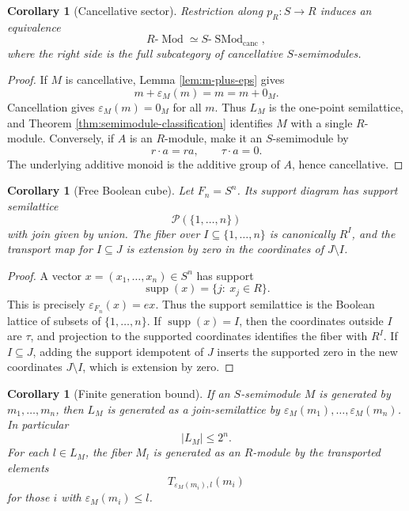 \documentclass[11pt]{article}
\newcommand{\supp}{\operatorname{supp}}
\newcommand{\eps}{\varepsilon}
\theoremstyle{plain}
\newtheorem{corollary}[theorem]{Corollary}
\theoremstyle{definition}
\begin{document}
\begin{corollary}[Cancellative sector]\label{cor:cancellative}
Restriction along \(p_R:S\to R\) induces an equivalence
\[
   R\text{-}\operatorname{Mod}\simeq S\text{-}\operatorname{SMod}_{\operatorname{canc}},
\]
where the right side is the full subcategory of cancellative \(S\)-semimodules.
\end{corollary}

\begin{proof}
If \(M\) is cancellative, Lemma \ref{lem:m-plus-eps} gives
\[
   m+\eps_M(m)=m=m+0_M.
\]
Cancellation gives \(\eps_M(m)=0_M\) for all \(m\).  Thus \(L_M\) is the one-point semilattice, and Theorem \ref{thm:semimodule-classification} identifies \(M\) with a single \(R\)-module.  Conversely, if \(A\) is an \(R\)-module, make it an \(S\)-semimodule by
\[
   r\cdot a=ra,
   \qquad
   \tau\cdot a=0.
\]
The underlying additive monoid is the additive group of \(A\), hence cancellative.
\end{proof}

\begin{corollary}[Free Boolean cube]\label{cor:free-cube}
Let \(F_n=S^n\).  Its support diagram has support semilattice
\[
   \mathcal P(\{1,\ldots,n\})
\]
with join given by union.  The fiber over \(I\subseteq\{1,\ldots,n\}\) is canonically \(R^I\), and the transport map for \(I\subseteq J\) is extension by zero in the coordinates of \(J\setminus I\).
\end{corollary}

\begin{proof}
A vector \(x=(x_1,\ldots,x_n)\in S^n\) has support
\[
   \supp(x)=\{j:\ x_j\in R\}.
\]
This is precisely \(\eps_{F_n}(x)=ex\).  Thus the support semilattice is the Boolean lattice of subsets of \(\{1,\ldots,n\}\).  If \(\supp(x)=I\), then the coordinates outside \(I\) are \(\tau\), and projection to the supported coordinates identifies the fiber with \(R^I\).  If \(I\subseteq J\), adding the support idempotent of \(J\) inserts the supported zero in the new coordinates \(J\setminus I\), which is extension by zero.
\end{proof}

\begin{corollary}[Finite generation bound]\label{cor:finite-generation}
If an \(S\)-semimodule \(M\) is generated by \(m_1,\ldots,m_n\), then \(L_M\) is generated as a join-semilattice by \(\eps_M(m_1),\ldots,\eps_M(m_n)\).  In particular
\[
   |L_M|\le 2^n.
\]
For each \(l\in L_M\), the fiber \(M_l\) is generated as an \(R\)-module by the transported elements
\[
   T_{\eps_M(m_i),l}(m_i)
\]
for those \(i\) with \(\eps_M(m_i)\le l\).
\end{corollary}
\end{document}
